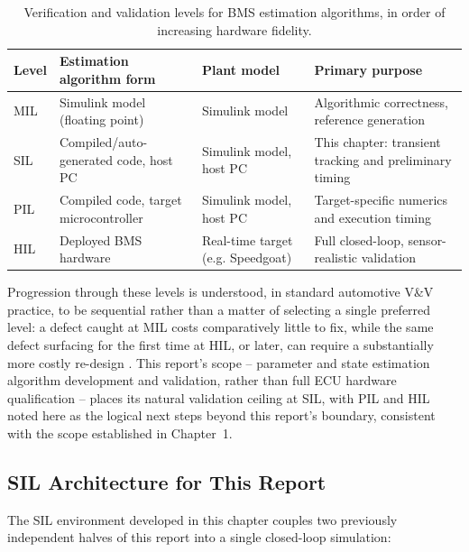 \begin{table}[htbp]
	\centering
	\caption{Verification and validation levels for BMS estimation algorithms, in order of increasing hardware fidelity.}
	\label{tab:xil_levels}
	\begin{tabular}{p{1.6cm}p{3.0cm}p{3.4cm}p{3.4cm}}
		\toprule
		Level & Estimation algorithm form & Plant model & Primary purpose \\
		\midrule
		MIL & Simulink model (floating point) & Simulink model & Algorithmic correctness, reference generation \\
		SIL & Compiled/auto-generated code, host PC & Simulink model, host PC & This chapter: transient tracking and preliminary timing \\
		PIL & Compiled code, target microcontroller & Simulink model, host PC & Target-specific numerics and execution timing \\
		HIL & Deployed BMS hardware & Real-time target (e.g. Speedgoat) & Full closed-loop, sensor-realistic validation \\
		\bottomrule
	\end{tabular}
\end{table}

Progression through these levels is understood, in standard automotive V\&V practice, to be sequential rather than a matter of selecting a single preferred level: a defect caught at MIL costs comparatively little to fix, while the same defect surfacing for the first time at HIL, or later, can require a substantially more costly re-design \cite{askui_xil_hierarchy}. This report's scope -- parameter and state estimation algorithm development and validation, rather than full ECU hardware qualification -- places its natural validation ceiling at SIL, with PIL and HIL noted here as the logical next steps beyond this report's boundary, consistent with the scope established in Chapter~1.

\subsection{SIL Architecture for This Report}
\label{ssec:sil_architecture}

The SIL environment developed in this chapter couples two previously independent halves of this report into a single closed-loop simulation:

